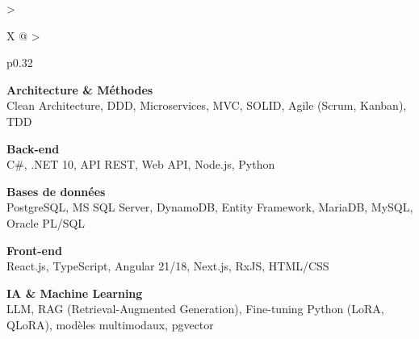 \documentclass[10pt,a4paper]{article}
\begin{document}
\begin{tabularx}{\textwidth}{
  >{\raggedright\arraybackslash}X
  @{\hspace{1cm}}
  >{\raggedright\arraybackslash}p{0.32\textwidth}
}
\begin{minipage}[t]{\linewidth}
\vspace{4pt}

\textbf{\color{primary} Architecture \& Méthodes}\\
\color{darkgray} Clean Architecture, DDD, Microservices, MVC, SOLID, Agile (Scrum, Kanban), TDD

\vspace{4pt}

\textbf{\color{primary} Back-end}\\
\color{darkgray} C\#, .NET 10, API REST, Web API, Node.js, Python

\vspace{4pt}

\textbf{\color{primary} Bases de données}\\
\color{darkgray} PostgreSQL, MS SQL Server, DynamoDB, Entity Framework, MariaDB, MySQL, Oracle PL/SQL

\vspace{4pt}

\textbf{\color{primary} Front-end}\\
\color{darkgray} React.js, TypeScript, Angular 21/18, Next.js, RxJS, HTML/CSS

\vspace{4pt}

\textbf{\color{primary} IA \& Machine Learning}\\
\color{darkgray} LLM, RAG (Retrieval-Augmented Generation), Fine-tuning Python (LoRA, QLoRA), modèles multimodaux, pgvector

\vspace{4pt}

\end{minipage}
\\
\end{tabularx}
\end{document}
